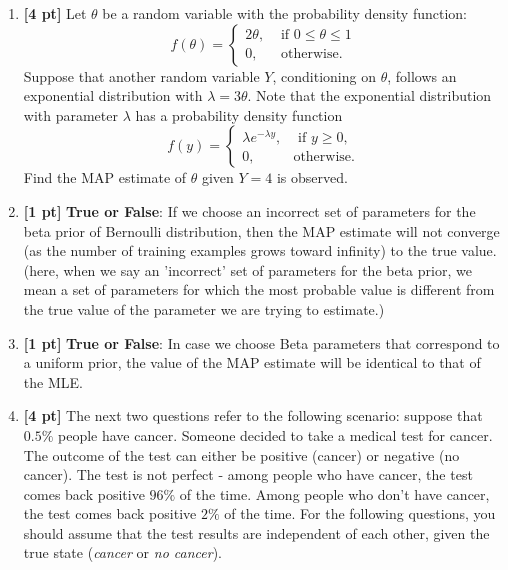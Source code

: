 \documentclass{article}
\begin{document}
\begin{enumerate}
    \item \textbf{[4 pt]} Let $\theta$ be a random variable with the probability density function:
    \[
    f(\theta) = 
    \begin{cases}
    2\theta, &\text{ if } 0 \leq \theta \leq 1 \\
    0, &\text{ otherwise}.
    \end{cases}
    \]
    Suppose that another random variable $Y$, conditioning on $\theta$, follows an exponential distribution with $\lambda=3\theta$. Note that the exponential distribution with parameter $\lambda$ has a probability density function
    \[
    f(y) = 
    \begin{cases}
    \lambda e^{-\lambda y}, &\text{ if } y \geq 0, \\
    0, &\text{otherwise}.
    \end{cases}
    \]
    Find the MAP estimate of $\theta$ given $Y=4$ is observed.
    \begin{tcolorbox}[width=\linewidth/3,height=1.5cm]
    \end{tcolorbox}
    
    \item \textbf{[1 pt]} \textbf{True or False}: If we choose an incorrect set of parameters for the beta prior of Bernoulli distribution, then the MAP estimate will not converge (as the number of training examples grows toward infinity) to the true value.  (here, when we say an 'incorrect' set of parameters for the beta prior, we mean a set of parameters for which the most probable value is different from the true value of the parameter we are trying to estimate.)
    \begin{tcolorbox}[width=\linewidth/3,height=1.5cm]
    \end{tcolorbox}
    \item \textbf{[1 pt]} \textbf{True or False}: In case we choose Beta parameters that correspond to a uniform prior, the value of the MAP estimate will be identical to that of the MLE.
    \begin{tcolorbox}[width=\linewidth/3,height=1.5cm]
    \end{tcolorbox}
    \item \textbf{[4 pt]} The next two questions refer to the following scenario: suppose that $0.5\%$ people have cancer. Someone decided to take a medical test for cancer. The outcome of the test can either be positive (cancer) or negative (no cancer). The test is not perfect - among people who have cancer, the test comes back positive $96\%$ of the time. Among people who don't have cancer, the test comes back positive $2\%$ of the time. For the following questions, you should assume that the test results are independent of each other, given the true state (\textit{cancer} or \textit{no cancer}).
    

\end{enumerate}
\end{document}
